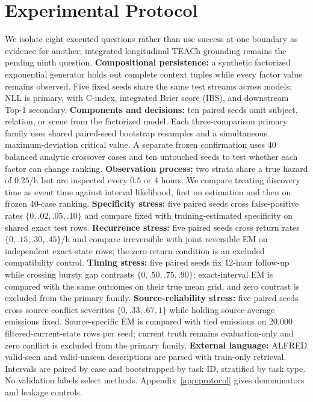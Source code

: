 \documentclass{article}
\begin{document}
\section{Experimental Protocol}
We isolate eight executed questions rather than use success at one boundary as evidence for another; integrated longitudinal TEACh grounding remains the pending ninth question.
\textbf{Compositional persistence:} a synthetic factorized exponential generator holds out complete context tuples while every factor value remains observed. Five fixed seeds share the same test streams across models; NLL is primary, with C-index, integrated Brier score (IBS), and downstream Top-1 secondary.
\textbf{Components and decisions:} ten paired seeds omit subject, relation, or scene from the factorized model. Each three-comparison primary family uses shared paired-seed bootstrap resamples and a simultaneous maximum-deviation critical value. A separate frozen confirmation uses 40 balanced analytic crossover cases and ten untouched seeds to test whether each factor can change ranking.
\textbf{Observation process:} two strata share a true hazard of $0.25$/h but are inspected every $0.5$ or $4$ hours. We compare treating discovery time as event time against interval likelihood, first on estimation and then on frozen 40-case ranking.
\textbf{Specificity stress:} five paired seeds cross false-positive rates $\{0,.02,.05,.10\}$ and compare fixed with training-estimated specificity on shared exact test rows.
\textbf{Recurrence stress:} five paired seeds cross return rates $\{0,.15,.30,.45\}$/h and compare irreversible with joint reversible EM on independent exact-state rows; the zero-return condition is an excluded compatibility control.
\textbf{Timing stress:} five paired seeds fix 12-hour follow-up while crossing bursty gap contrasts $\{0,.50,.75,.90\}$; exact-interval EM is compared with the same outcomes on their true mean grid, and zero contrast is excluded from the primary family.
\textbf{Source-reliability stress:} five paired seeds cross source-conflict severities $\{0,.33,.67,1\}$ while holding source-average emissions fixed. Source-specific EM is compared with tied emissions on 20,000 filtered-current-state rows per seed; current truth remains evaluation-only and zero conflict is excluded from the primary family.
\textbf{External language:} ALFRED \citep{shridhar2020alfred} valid-seen and valid-unseen descriptions are parsed with train-only retrieval. Intervals are paired by case and bootstrapped by task ID, stratified by task type. No validation labels select methods. Appendix~\ref{app:protocol} gives denominators and leakage controls.
\end{document}
